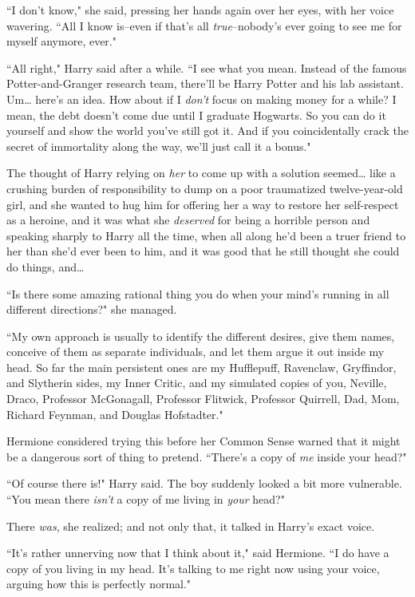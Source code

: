 ``I don't know," she said, pressing her hands again over her eyes, with her voice wavering. ``All I know is\---even if that's all \emph{true}\---nobody's ever going to see me for myself anymore, ever."

``All right," Harry said after a while. ``I see what you mean. Instead of the famous Potter-and-Granger research team, there'll be Harry Potter and his lab assistant. Um{\ldots} here's an idea. How about if I \emph{don't} focus on making money for a while? I mean, the debt doesn't come due until I graduate Hogwarts. So you can do it yourself and show the world you've still got it. And if you coincidentally crack the secret of immortality along the way, we'll just call it a bonus."

The thought of Harry relying on \emph{her} to come up with a solution seemed{\ldots} like a crushing burden of responsibility to dump on a poor traumatized twelve-year-old girl, and she wanted to hug him for offering her a way to restore her self-respect as a heroine, and it was what she \emph{deserved} for being a horrible person and speaking sharply to Harry all the time, when all along he'd been a truer friend to her than she'd ever been to him, and it was good that he still thought she could do things, and{\ldots}

``Is there some amazing rational thing you do when your mind's running in all different directions?" she managed.

``My own approach is usually to identify the different desires, give them names, conceive of them as separate individuals, and let them argue it out inside my head. So far the main persistent ones are my Hufflepuff, Ravenclaw, Gryffindor, and Slytherin sides, my Inner Critic, and my simulated copies of you, Neville, Draco, Professor McGonagall, Professor Flitwick, Professor Quirrell, Dad, Mom, Richard Feynman, and Douglas Hofstadter."

Hermione considered trying this before her Common Sense warned that it might be a dangerous sort of thing to pretend. ``There's a copy of \emph{me} inside your head?"

``Of course there is!" Harry said. The boy suddenly looked a bit more vulnerable. ``You mean there \emph{isn't} a copy of me living in \emph{your} head?"

There \emph{was}, she realized; and not only that, it talked in Harry's exact voice.

``It's rather unnerving now that I think about it," said Hermione. ``I do have a copy of you living in my head. It's talking to me right now using your voice, arguing how this is perfectly normal."

